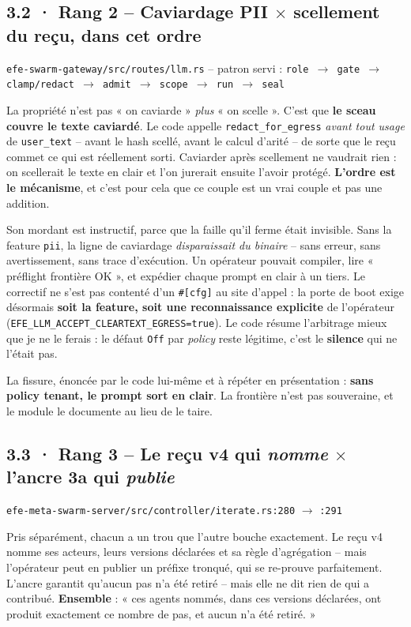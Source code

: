 \documentclass[10pt]{article}
\newcommand{\sz}[1]{{\small\color{grey}\textsf{#1}}}
\newcommand{\code}[1]{\texttt{\small #1}}
\newcommand{\x}{$\times$}
\begin{document}
\subsection{3.2 · Rang 2 -- Caviardage PII \x{} scellement du reçu, \textbf{dans cet ordre}}

\sz{\code{efe-swarm-gateway/src/routes/llm.rs} -- patron servi : \code{role $\rightarrow$ gate $\rightarrow$ clamp/redact $\rightarrow$ admit $\rightarrow$ scope $\rightarrow$ run $\rightarrow$ seal}}

La propriété n'est pas « on caviarde » \emph{plus} « on scelle ». C'est que \textbf{le sceau couvre le
texte caviardé}. Le code appelle \code{redact\_for\_egress} \emph{avant tout usage} de
\code{user\_text} -- avant le hash scellé, avant le calcul d'arité -- de sorte que le reçu commet ce
qui est réellement sorti. Caviarder après scellement ne vaudrait rien : on scellerait le texte en
clair et l'on jurerait ensuite l'avoir protégé. \textbf{L'ordre est le mécanisme}, et c'est pour cela
que ce couple est un vrai couple et pas une addition.

Son mordant est instructif, parce que la faille qu'il ferme était invisible. Sans la feature
\code{pii}, la ligne de caviardage \emph{disparaissait du binaire} -- sans erreur, sans avertissement,
sans trace d'exécution. Un opérateur pouvait compiler, lire « préflight frontière OK », et expédier
chaque prompt en clair à un tiers. Le correctif ne s'est pas contenté d'un \code{\#[cfg]} au site
d'appel : la porte de boot exige désormais \textbf{soit la feature, soit une reconnaissance explicite}
de l'opérateur (\code{EFE\_LLM\_ACCEPT\_CLEARTEXT\_EGRESS=true}). Le code résume l'arbitrage mieux que
je ne le ferais : le défaut \code{Off} par \emph{policy} reste légitime, c'est le \textbf{silence} qui
ne l'était pas.

La fissure, énoncée par le code lui-même et à répéter en présentation : \textbf{sans policy tenant, le
prompt sort en clair}. La frontière n'est pas souveraine, et le module le documente au lieu de le taire.

\subsection{3.3 · Rang 3 -- Le reçu v4 qui \emph{nomme} \x{} l'ancre 3a qui \emph{publie}}

\sz{\code{efe-meta-swarm-server/src/controller/iterate.rs:280} $\rightarrow$ \code{:291}}

Pris séparément, chacun a un trou que l'autre bouche exactement. Le reçu v4 nomme ses acteurs, leurs
versions déclarées et sa règle d'agrégation -- mais l'opérateur peut en publier un préfixe tronqué,
qui se re-prouve parfaitement. L'ancre garantit qu'aucun pas n'a été retiré -- mais elle ne dit rien de
qui a contribué. \textbf{Ensemble} : « ces agents nommés, dans ces versions déclarées, ont produit
exactement ce nombre de pas, et aucun n'a été retiré. »
\end{document}
